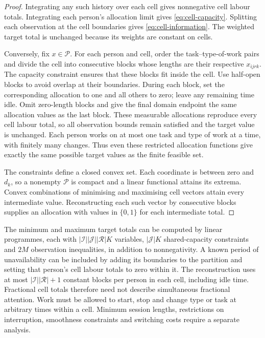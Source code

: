 \begin{proof}
Integrating any such history over each cell gives nonnegative cell labour totals. Integrating each person's allocation limit gives \eqref{eq:cell-capacity}. Splitting each observation at the cell boundaries gives \eqref{eq:cell-information}. The weighted target total is unchanged because its weights are constant on cells.

Conversely, fix $x\in\mathcal P$. For each person and cell, order the task--type-of-work pairs and divide the cell into consecutive blocks whose lengths are their respective $x_{ijrk}$. The capacity constraint ensures that these blocks fit inside the cell. Use half-open blocks to avoid overlap at their boundaries. During each block, set the corresponding allocation to one and all others to zero; leave any remaining time idle. Omit zero-length blocks and give the final domain endpoint the same allocation values as the last block. These measurable allocations reproduce every cell labour total, so all observation bounds remain satisfied and the target value is unchanged. Each person works on at most one task and type of work at a time, with finitely many changes. Thus even these restricted allocation functions give exactly the same possible target values as the finite feasible set.

The constraints define a closed convex set. Each coordinate is between zero and $d_k$, so a nonempty $\mathcal P$ is compact and a linear functional attains its extrema. Convex combinations of minimising and maximising cell vectors attain every intermediate value. Reconstructing each such vector by consecutive blocks supplies an allocation with values in $\{0,1\}$ for each intermediate total.
\end{proof}

The minimum and maximum target totals can be computed by linear programmes, each with $|\mathcal I||\mathcal J||\mathcal R|K$ variables, $|\mathcal J|K$ shared-capacity constraints and $2M$ observation inequalities, in addition to nonnegativity. A known period of unavailability can be included by adding its boundaries to the partition and setting that person's cell labour totals to zero within it. The reconstruction uses at most $|\mathcal I||\mathcal R|+1$ constant blocks per person in each cell, including idle time. Fractional cell totals therefore need not describe simultaneous fractional attention. Work must be allowed to start, stop and change type or task at arbitrary times within a cell. Minimum session lengths, restrictions on interruption, smoothness constraints and switching costs require a separate analysis.

